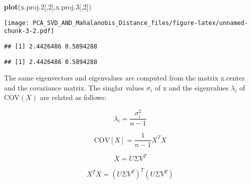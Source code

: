 \documentclass[]{article}
\newenvironment{Shaded}{\begin{snugshade}}{\end{snugshade}}
\newcommand{\KeywordTok}[1]{\textcolor[rgb]{0.13,0.29,0.53}{\textbf{{#1}}}}
\newcommand{\DecValTok}[1]{\textcolor[rgb]{0.00,0.00,0.81}{{#1}}}
\newcommand{\FloatTok}[1]{\textcolor[rgb]{0.00,0.00,0.81}{{#1}}}
\newcommand{\StringTok}[1]{\textcolor[rgb]{0.31,0.60,0.02}{{#1}}}
\newcommand{\NormalTok}[1]{{#1}}
\begin{document}
\begin{Shaded}
\begin{Highlighting}[]
\KeywordTok{plot}\NormalTok{(x.proj}\FloatTok{.2}\NormalTok{[,}\DecValTok{2}\NormalTok{],x.proj}\FloatTok{.3}\NormalTok{[,}\DecValTok{2}\NormalTok{])}
\end{Highlighting}
\end{Shaded}

\texttt{[image: PCA\_SVD\_AND\_Mahalanobis\_Distance\_files/figure-latex/unnamed-chunk-3-2.pdf]}

\begin{Shaded}
\end{Shaded}

\begin{verbatim}
## [1] 2.4426486 0.5894288
\end{verbatim}

\begin{Shaded}
\end{Shaded}

\begin{verbatim}
## [1] 2.4426486 0.5894288
\end{verbatim}

The same eigenvectors and eigenvalues are computed from the matrix
x.center and the covariance matrix. The singlar values \(\sigma_i\) of x
and the eigenvalues \(\lambda_i\) of COV\((X)\) are related as follows:

\begin{equation}
\lambda_i = \frac{\sigma_i^2}{n-1} 
\end{equation}

\begin{equation}
\text{COV} \left [ X \right ] = \frac{1}{n-1}X^TX 
\end{equation}

\begin{equation}
X = U \Sigma V^T 
\end{equation}

\begin{equation}
X^TX = (U \Sigma V^T)^T (U \Sigma V^T)
\end{equation}
\end{document}

